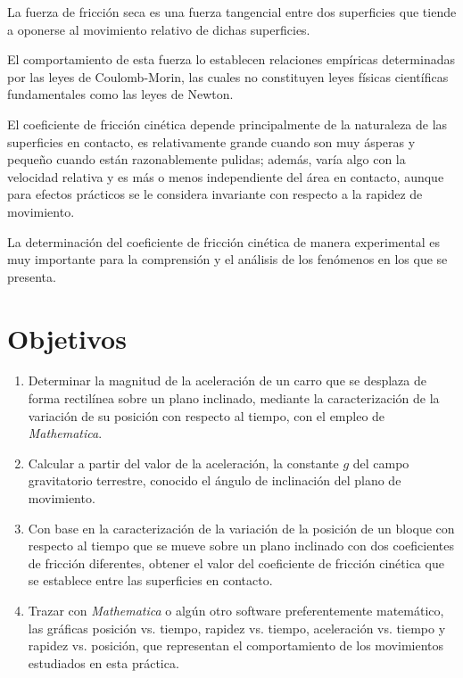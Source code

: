 \documentclass[12pt, titlepage]{report}
\begin{document}
    La fuerza de fricción seca es una fuerza tangencial entre dos superficies que tiende a oponerse al movimiento relativo de dichas superficies.

    El comportamiento de esta fuerza lo establecen relaciones empíricas determinadas por las leyes de Coulomb-Morin, las cuales no constituyen leyes físicas científicas fundamentales como las leyes de Newton.

    El coeficiente de fricción cinética depende principalmente de la naturaleza de las superficies en contacto, es relativamente grande cuando son muy ásperas y pequeño cuando están razonablemente pulidas; además, varía algo con la velocidad relativa y es más o menos independiente del área en contacto, aunque para efectos prácticos se le considera invariante con respecto a la rapidez de movimiento.

    La determinación del coeficiente de fricción cinética de manera experimental es muy importante para la comprensión y el análisis de los fenómenos en los que se presenta. 

    \section*{Objetivos}
    \begin{enumerate}
        \item Determinar la magnitud de la aceleración de un carro que se desplaza de forma rectilínea sobre un plano inclinado, mediante la caracterización de la variación de su posición con respecto al tiempo, con el empleo de \textit{Mathematica}. 
        \item Calcular a partir del valor de la aceleración, la constante $g$ del campo gravitatorio terrestre, conocido el ángulo de inclinación del plano de movimiento. 
        \item Con base en la caracterización de la variación de la posición de un bloque con respecto al tiempo que se mueve sobre un plano inclinado con dos coeficientes de fricción diferentes, obtener el valor del coeficiente de fricción cinética que se establece entre las superficies en contacto. 
        \item Trazar con \textit{Mathematica} o algún otro software preferentemente matemático, las gráficas posición vs. tiempo, rapidez vs. tiempo, aceleración vs. tiempo y rapidez vs. posición, que representan el comportamiento de los movimientos estudiados en esta práctica. 
    \end{enumerate}
\end{document}
